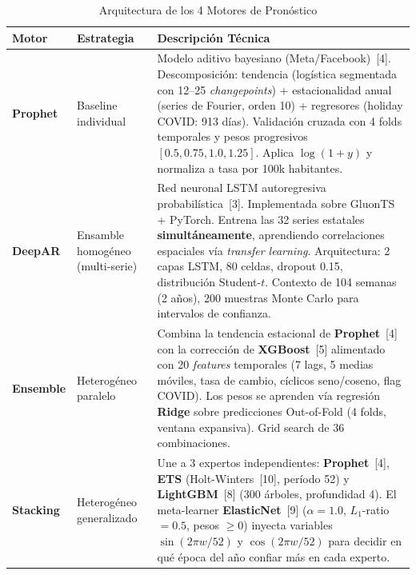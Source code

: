 \documentclass[12pt, letterpaper]{article}
\begin{document}
\begin{table}[H]
\centering
\caption{Arquitectura de los 4 Motores de Pronóstico}
\label{tab:motores}
\small
\begin{tabularx}{\textwidth}{>{\raggedright\arraybackslash}p{1.8cm} >{\raggedright\arraybackslash}p{2.2cm} X}
\toprule
\textbf{Motor} & \textbf{Estrategia} & \textbf{Descripción Técnica} \\
\midrule
\rowcolor{cprophet!10}
\textbf{Prophet} & Baseline individual & Modelo aditivo bayesiano (Meta/Facebook)~[4]. Descomposición: tendencia (logística segmentada con 12--25 \textit{changepoints}) + estacionalidad anual (series de Fourier, orden 10) + regresores (holiday COVID: 913 días). Validación cruzada con 4 folds temporales y pesos progresivos $[0.5, 0.75, 1.0, 1.25]$. Aplica $\log(1+y)$ y normaliza a tasa por 100k habitantes. \\
\addlinespace
\rowcolor{cdeepar!10}
\textbf{DeepAR} & Ensamble homogéneo (multi-serie) & Red neuronal LSTM autoregresiva probabilística~[3]. Implementada sobre GluonTS + PyTorch. Entrena las 32 series estatales \textbf{simultáneamente}, aprendiendo correlaciones espaciales vía \textit{transfer learning}. Arquitectura: 2 capas LSTM, 80 celdas, dropout 0.15, distribución Student-$t$. Contexto de 104 semanas (2 años), 200 muestras Monte Carlo para intervalos de confianza. \\
\addlinespace
\rowcolor{censemble!10}
\textbf{Ensemble} & Heterogéneo paralelo & Combina la tendencia estacional de \textbf{Prophet}~[4] con la corrección de \textbf{XGBoost}~[5] alimentado con 20 \textit{features} temporales (7 lags, 5 medias móviles, tasa de cambio, cíclicos seno/coseno, flag COVID). Los pesos se aprenden vía regresión \textbf{Ridge} sobre predicciones Out-of-Fold (4 folds, ventana expansiva). Grid search de 36 combinaciones. \\
\addlinespace
\rowcolor{cstacking!10}
\textbf{Stacking} & Heterogéneo generalizado & Une a 3 expertos independientes: \textbf{Prophet}~[4], \textbf{ETS} (Holt-Winters~[10], período 52) y \textbf{LightGBM}~[8] (300 árboles, profundidad 4). El meta-learner \textbf{ElasticNet}~[9] ($\alpha=1.0$, $L_1$-ratio$=0.5$, pesos $\geq 0$) inyecta variables $\sin(2\pi w/52)$ y $\cos(2\pi w/52)$ para decidir en qué época del año confiar más en cada experto. \\
\bottomrule
\end{tabularx}
\end{table}
\end{document}
